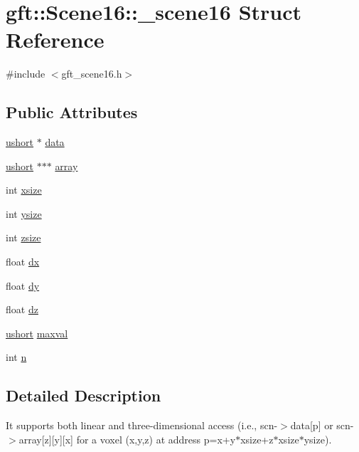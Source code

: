 \hypertarget{structgft_1_1Scene16_1_1__scene16}{\section{gft\-:\-:Scene16\-:\-:\-\_\-scene16 Struct Reference}
\label{structgft_1_1Scene16_1_1__scene16}
}


{\ttfamily \#include $<$gft\-\_\-scene16.\-h$>$}

\subsection*{Public Attributes}
\begin{DoxyCompactItemize}
\item 
\hyperlink{namespacegft_a878518cf75338c097e2c8e9b10bfb00d}{ushort} $\ast$ \hyperlink{structgft_1_1Scene16_1_1__scene16_aa54beddadad842e6b065b98bd1a16174}{data}
\item 
\hyperlink{namespacegft_a878518cf75338c097e2c8e9b10bfb00d}{ushort} $\ast$$\ast$$\ast$ \hyperlink{structgft_1_1Scene16_1_1__scene16_afa6f3ebda2199854c089949345743528}{array}
\item 
int \hyperlink{structgft_1_1Scene16_1_1__scene16_a8ae57178842d43cc00ac0a943559d567}{xsize}
\item 
int \hyperlink{structgft_1_1Scene16_1_1__scene16_a074635a9101766856f9c1925650017b9}{ysize}
\item 
int \hyperlink{structgft_1_1Scene16_1_1__scene16_a23459fd3e8f2a3b1a9fd973cd9cc672c}{zsize}
\item 
float \hyperlink{structgft_1_1Scene16_1_1__scene16_a05c332589ea319aa6c83fd870cc250be}{dx}
\item 
float \hyperlink{structgft_1_1Scene16_1_1__scene16_af0f1f87d9bb5150eb04a28a074f05d9f}{dy}
\item 
float \hyperlink{structgft_1_1Scene16_1_1__scene16_a34fb531b42960b8d86c61b4c7d33f24a}{dz}
\item 
\hyperlink{namespacegft_a878518cf75338c097e2c8e9b10bfb00d}{ushort} \hyperlink{structgft_1_1Scene16_1_1__scene16_a9fc6ef1ab4186efec3a186393a261597}{maxval}
\item 
int \hyperlink{structgft_1_1Scene16_1_1__scene16_a23fdfabcf912d8c2162aaa7cc6563ae9}{n}
\end{DoxyCompactItemize}


\subsection{Detailed Description}
It supports both linear and three-\/dimensional access (i.\-e., scn-\/$>$data\mbox{[}p\mbox{]} or scn-\/$>$array\mbox{[}z\mbox{]}\mbox{[}y\mbox{]}\mbox{[}x\mbox{]} for a voxel (x,y,z) at address p=x+y$\ast$xsize+z$\ast$xsize$\ast$ysize). 

